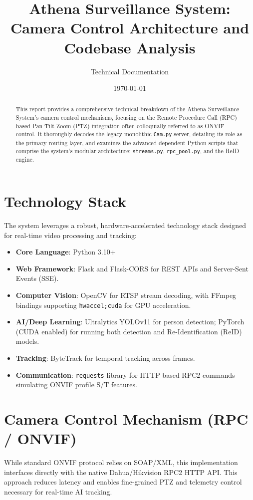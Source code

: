 \documentclass[12pt,a4paper]{article}
\title{\textbf{Athena Surveillance System: Camera Control Architecture and Codebase Analysis}}
\author{Technical Documentation}
\date{\today}
\begin{document}
\maketitle

\begin{abstract}
This report provides a comprehensive technical breakdown of the Athena Surveillance System's camera control mechanisms, focusing on the Remote Procedure Call (RPC) based Pan-Tilt-Zoom (PTZ) integration often colloquially referred to as ONVIF control. It thoroughly decodes the legacy monolithic \texttt{Cam.py} server, detailing its role as the primary routing layer, and examines the advanced dependent Python scripts that comprise the system's modular architecture: \texttt{streams.py}, \texttt{rpc\_pool.py}, and the ReID engine.
\end{abstract}

\section{Technology Stack}
The system leverages a robust, hardware-accelerated technology stack designed for real-time video processing and tracking:
\begin{itemize}
    \item \textbf{Core Language}: Python 3.10+
    \item \textbf{Web Framework}: Flask and Flask-CORS for REST APIs and Server-Sent Events (SSE).
    \item \textbf{Computer Vision}: OpenCV for RTSP stream decoding, with FFmpeg bindings supporting \texttt{hwaccel;cuda} for GPU acceleration.
    \item \textbf{AI/Deep Learning}: Ultralytics YOLOv11 for person detection; PyTorch (CUDA enabled) for running both detection and Re-Identification (ReID) models.
    \item \textbf{Tracking}: ByteTrack for temporal tracking across frames.
    \item \textbf{Communication}: \texttt{requests} library for HTTP-based RPC2 commands simulating ONVIF profile S/T features.
\end{itemize}

\section{Camera Control Mechanism (RPC / ONVIF)}
While standard ONVIF protocol relies on SOAP/XML, this implementation interfaces directly with the native Dahua/Hikvision RPC2 HTTP API. This approach reduces latency and enables fine-grained PTZ and telemetry control necessary for real-time AI tracking.
\end{document}
